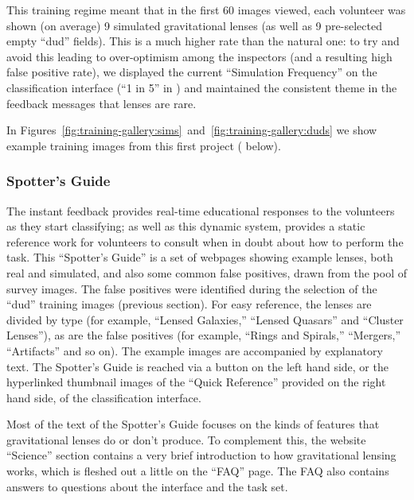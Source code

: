 \documentclass[useAMS,usenatbib,a4paper]{mn2e}
\begin{document}
This training regime meant that in the first 60 images viewed, each volunteer
was shown (on average) 9 simulated gravitational lenses (as well as 9
pre-selected empty ``dud'' fields). This is a much higher rate than the natural
one: to try and avoid this leading to over-optimism among the inspectors (and a
resulting high false positive rate), we displayed the current ``Simulation
Frequency'' on the classification interface (``1 in 5'' in
) and maintained the consistent theme in the feedback
messages that lenses are rare.

In Figures~\ref{fig:training-gallery:sims}~and~\ref{fig:training-gallery:duds}
we show example training images from this first \SW project (
below).


\subsubsection{Spotter's Guide}
\label{sec:design:training:guide}

The instant feedback provides real-time educational responses to the volunteers
as they start classifying; as well as this dynamic system, \SW provides a static
reference work for volunteers to consult when in doubt about how to perform the
task. This ``Spotter's Guide'' is a set of webpages showing example lenses, both
real and simulated, and also some common false positives, drawn from the pool of
survey images. The false positives were identified during the selection of the
``dud'' training images (previous section). For easy reference, the lenses are
divided by type (for example, ``Lensed Galaxies,'' ``Lensed Quasars'' and
``Cluster Lenses''), as are the false positives (for example, ``Rings and
Spirals,'' ``Mergers,'' ``Artifacts'' and so on). The example images are
accompanied by explanatory text. The Spotter's Guide is reached via a button on
the left hand side, or the hyperlinked thumbnail images of the ``Quick
Reference'' provided on the right hand side, of the classification interface.

Most of the text of the Spotter's Guide focuses on the kinds of features that
gravitational lenses do or don't produce. To complement this,
the website ``Science'' section contains a very brief introduction to how
gravitational lensing works, which is fleshed out a little on the ``FAQ'' page.
The FAQ also contains answers to questions about the interface
and the task set.


\end{document}
